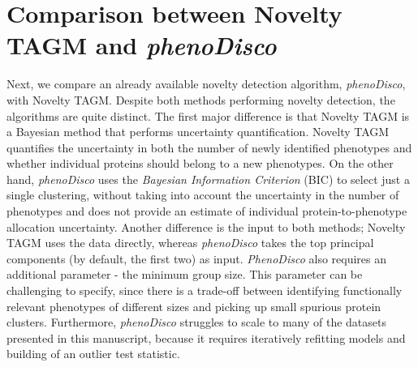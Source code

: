 \documentclass[12pt,english]{article}
\begin{document}
\section{Comparison between Novelty TAGM and \textit{phenoDisco}}
Next, we compare an already available novelty detection algorithm, \textit{phenoDisco}, with Novelty TAGM. Despite both methods performing novelty detection, the algorithms
are quite distinct. The first major difference is that Novelty TAGM is a Bayesian 
method that performs uncertainty quantification. Novelty TAGM quantifies the uncertainty in both the number of newly identified phenotypes and whether individual proteins should belong to a new phenotypes. On the other hand, \textit{phenoDisco} uses the \textit{Bayesian Information Criterion} (BIC) to select just a single clustering, without taking into account the uncertainty in the number of phenotypes and does not provide an estimate of individual protein-to-phenotype allocation uncertainty. Another difference is the input to both methods; Novelty TAGM uses the data directly, whereas \textit{phenoDisco} takes the top principal components (by default, the first two) as input. \textit{PhenoDisco} also requires an additional parameter - the minimum group size. This parameter can be challenging to specify, since there is a trade-off between identifying functionally relevant phenotypes of different sizes and picking up small spurious protein clusters. Furthermore, \textit{phenoDisco} struggles to scale to many of the datasets presented in this manuscript, because it requires iteratively refitting models and building of an outlier test statistic. 
\end{document}
